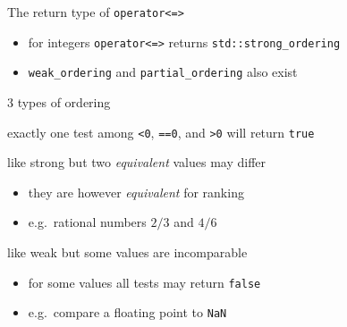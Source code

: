 \begin{frame}[fragile]
  \begin{block}{The return type of \texttt{operator<=>}}
    \begin{itemize}
    \item for integers \texttt{operator<=>} returns \texttt{std::strong_ordering}
    \item \texttt{weak_ordering} and \texttt{partial_ordering} also exist
    \end{itemize}
  \end{block}
  \begin{exampleblock}{3 types of ordering}
    \begin{description}[partial]
    \item[strong] exactly one test among \texttt{<0}, \texttt{==0}, and \texttt{>0} will return \texttt{true}
    \item[weak] like strong but two \emph{equivalent} values may differ
      \begin{itemize}
      \item they are however \emph{equivalent} for ranking
      \item e.g.\ rational numbers $2/3$ and $4/6$
      \end{itemize}
    \item[partial] like weak but some values are incomparable
      \begin{itemize}
      \item for some values all tests may return \texttt{false}
      \item e.g.\ compare a floating point to \texttt{NaN}
      \end{itemize}
    \end{description}
  \end{exampleblock}
\end{frame}

